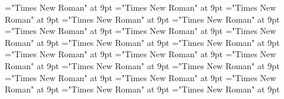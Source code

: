 \documentclass[gps1,twoside]{article}
\begin{document}
\font\variantentrytypesvariantformentrybackrefvariantformentrybackrefssensesensessensesensessubentrysubentriesentryafter="Times New Roman" at 9pt
\font\spanspanreverseabbrvariantentrytypevariantentrytypesvariantformentrybackrefvariantformentrybackrefssensesensessensesensessubentrysubentriesentrybefore="Times New Roman" at 9pt
\font\spanreverseabbrvariantentrytypevariantentrytypesvariantformentrybackrefvariantformentrybackrefssensesensessensesensessubentrysubentriesentrylastchildafter="Times New Roman" at 9pt
\font\spanspanheadwordvariantformentrybackrefvariantformentrybackrefssensesensessensesensessubentrysubentriesentrybefore="Times New Roman" at 9pt
\font\spanspanowningentrysummarydefinitionvariantformentrybackrefvariantformentrybackrefssensesensessensesensessubentrysubentriesentrybefore="Times New Roman" at 9pt
\font\spanowningentrysummarydefinitionvariantformentrybackrefvariantformentrybackrefssensesensessensesensessubentrysubentriesentrylastchildafter="Times New Roman" at 9pt
\font\scientificnamesensesensessensesensessubentrysubentriesentryafter="Times New Roman" at 9pt
\font\semanticdomainsemanticdomainsemanticdomainssensesensessensesensessubentrysubentriesentrybefore="Times New Roman" at 9pt
\font\semanticdomainssensesensessensesensessubentrysubentriesentrybefore="Times New Roman" at 9pt
\font\semanticdomainssensesensessensesensessubentrysubentriesentryafter="Times New Roman" at 9pt
\font\spanspanabbreviationsemanticdomainsemanticdomainssensesensessensesensessubentrysubentriesentrybefore="Times New Roman" at 9pt
\font\spanabbreviationsemanticdomainsemanticdomainssensesensessensesensessubentrysubentriesentrylastchildafter="Times New Roman" at 9pt
\font\spanspannamesemanticdomainsemanticdomainssensesensessensesensessubentrysubentriesentrybefore="Times New Roman" at 9pt
\font\academicdomainacademicdomainacademicdomainssensesensessensesensessubentrysubentriesentrybefore="Times New Roman" at 9pt
\font\academicdomainssensesensessensesensessubentrysubentriesentrybefore="Times New Roman" at 9pt
\font\academicdomainssensesensessensesensessubentrysubentriesentryafter="Times New Roman" at 9pt
\font\spanspanabbreviationacademicdomainacademicdomainssensesensessensesensessubentrysubentriesentrybefore="Times New Roman" at 9pt
\font\spanspannameacademicdomainacademicdomainssensesensessensesensessubentrysubentriesentrybefore="Times New Roman" at 9pt
\font\spannameacademicdomainacademicdomainssensesensessensesensessubentrysubentriesentryfirstchildbefore="Times New Roman" at 9pt
\font\spannameacademicdomainacademicdomainssensesensessensesensessubentrysubentriesentrylastchildafter="Times New Roman" at 9pt
\end{document}
